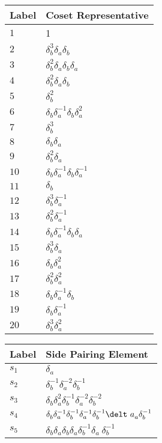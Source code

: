 \documentclass{article}
\begin{document}

\begin{center}
\begin{tabular}{ll}
\toprule
Label & Coset Representative\\
\midrule
$1$ & 1 \\
$2$ & $\delta_b^{3}\delta_a^{}\delta_b^{}$ \\
$3$ & $\delta_b^{2}\delta_a^{}\delta_b^{}\delta_a^{}$ \\
$4$ & $\delta_b^{2}\delta_a^{}\delta_b^{}$ \\
$5$ & $\delta_b^{2}$ \\
$6$ & $\delta_b^{}\delta_a^{-1}\delta_b^{}\delta_a^{2}$ \\
$7$ & $\delta_b^{3}$ \\
$8$ & $\delta_b^{}\delta_a^{}$ \\
$9$ & $\delta_b^{2}\delta_a^{}$ \\
$10$ & $\delta_b^{}\delta_a^{-1}\delta_b^{}\delta_a^{-1}$ \\
$11$ & $\delta_b^{}$ \\
$12$ & $\delta_b^{3}\delta_a^{-1}$ \\
$13$ & $\delta_b^{2}\delta_a^{-1}$ \\
$14$ & $\delta_b^{}\delta_a^{-1}\delta_b^{}\delta_a^{}$ \\
$15$ & $\delta_b^{3}\delta_a^{}$ \\
$16$ & $\delta_b^{}\delta_a^{2}$ \\
$17$ & $\delta_b^{2}\delta_a^{2}$ \\
$18$ & $\delta_b^{}\delta_a^{-1}\delta_b^{}$ \\
$19$ & $\delta_b^{}\delta_a^{-1}$ \\
$20$ & $\delta_b^{3}\delta_a^{2}$ \\
\bottomrule
\end{tabular}
\hfill
\begin{tabular}{ll}
\toprule
Label & Side Pairing Element\\
\midrule
$s_{1}$ & $\delta_a^{}$ \\
$s_{2}$ & $\delta_b^{-1}\delta_a^{-2}\delta_b^{-1}$ \\
$s_{3}$ & $\delta_b^{}\delta_a^{2}\delta_b^{-1}\delta_a^{-2}\delta_b^{-2}$ \\
$s_{4}$ & $\delta_b^{}\delta_a^{-1}\delta_b^{-1}\delta_a^{-1}\delta_b^{-1}\delt\
a_a^{}\delta_b^{-1}$ \\
$s_{5}$ & $\delta_b^{}\delta_a^{}\delta_b^{}\delta_a^{}\delta_b^{-1}\delta_a^{}\
\delta_b^{-1}$ \\

\end{tabular}
\end{center}
\end{document}
